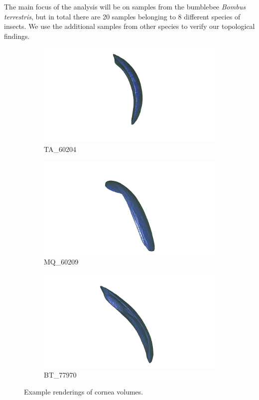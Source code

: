 The main focus of the analysis will be on samples from the bumblebee \textit{Bombus terrestris}, but in total there are 20 samples belonging to 8 different species of insects. We use the additional samples from other species to verify our topological findings.

\begin{figure}[h]
  \centering
  \begin{subfigure}{.3 \linewidth}
  \centering
  \includegraphics[scale=0.2]{ta60204_cornea.png}
  \caption{TA\_60204}
  \end{subfigure}%
  \begin{subfigure}{.3 \linewidth}
  \centering
  \includegraphics[scale=0.2]{mq60209_cornea.png}
  \caption{MQ\_60209}
  \end{subfigure}%
  \begin{subfigure}{.3 \linewidth}
  \centering
  \includegraphics[scale=0.2]{bt77970_cornea.png}
  \caption{BT\_77970}
  \end{subfigure}
  \caption{\label{corneas} Example renderings of cornea volumes.}
\end{figure}

